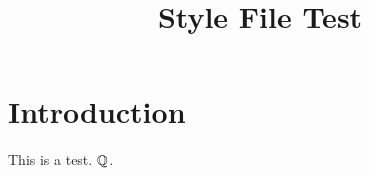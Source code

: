 \documentclass{scrartcl}
\title{Style File Test}
\begin{document}
\maketitle

\begin{abstract}

\end{abstract}

\section{Introduction}
This is a test. $\mathbb Q$.
\end{document}
